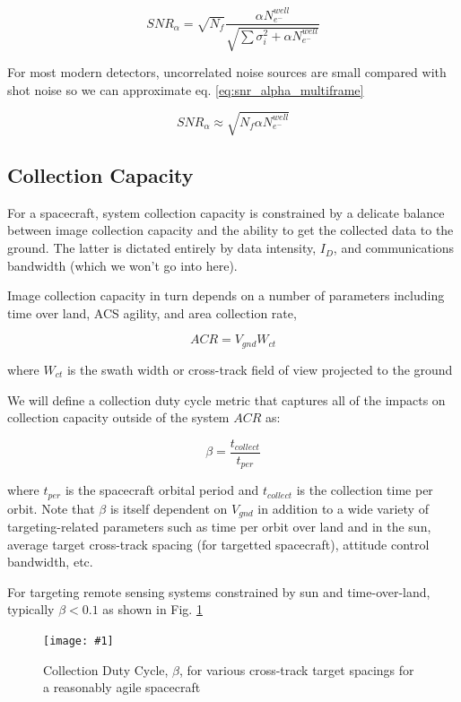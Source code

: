 \documentclass[10pt,journal]{IEEEtran}  %
\newcommand{\includefigure}[3]
{
  \begin{figure}[h!]
  \centering
  \texttt{[image: \#1]}
  \caption[]{#3}
  \label{#2}
  \end{figure}
}
\begin{document}
\begin{equation}
\label{eq:snr_alpha_multiframe}
SNR_{\alpha} = \sqrt{N_f}\frac{\alpha N_{e^-}^{well}}{\sqrt{\sum{\sigma_i^2} + \alpha N_{e^-}^{well}}}
\end{equation}

For most modern detectors, uncorrelated noise sources are small compared with shot noise so we can approximate eq. \ref{eq:snr_alpha_multiframe}

\begin{equation}
\label{eq:snr_alpha_multiframe_simp}
SNR_{\alpha} \approx \sqrt{N_f \alpha N_{e^-}^{well}}
\end{equation}

\subsection{Collection Capacity}
\label{sec:capacity}
For a spacecraft, system collection capacity is constrained by a delicate balance between image collection capacity and the ability to get the collected data to the ground.  The latter is dictated entirely by data intensity, $I_D$, and communications bandwidth (which we won't go into here).  

Image collection capacity in turn depends on a number of parameters including time over land, ACS agility, and area collection rate,

$$ACR = V_{gnd}W_{ct}$$

where $W_{ct}$ is the swath width or cross-track field of view projected to the ground

We will define a collection duty cycle metric that captures all of the impacts on collection capacity outside of the system $ACR$ as:

\begin{equation}
    \beta = \frac{t_{collect}}{t_{per}}
\end{equation} 

where $t_{per}$ is the spacecraft orbital period and $t_{collect}$ is the collection time per orbit.  Note that $\beta$ is itself dependent on $V_{gnd}$ in addition to a wide variety of targeting-related parameters such as time per orbit over land and in the sun, average target cross-track spacing (for targetted spacecraft), attitude control bandwidth, etc.

For targeting remote sensing systems constrained by sun and time-over-land, typically $\beta < 0.1$ as shown in Fig. \ref{fig:beta}

\includefigure{figures/collection_dc.pgf}{fig:beta}{Collection Duty Cycle, $\beta$, for various cross-track target spacings for a reasonably agile spacecraft}
\end{document}
